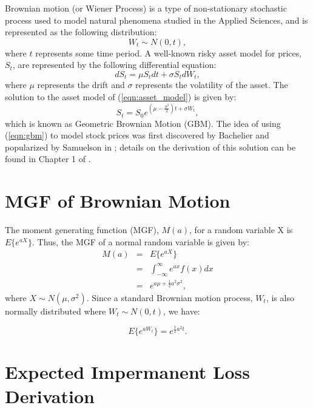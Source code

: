 \documentclass[journal,twocolumn,12pt]{ieeesyscoin}
\begin{document}
Brownian motion (or Wiener Process) is a type of non-stationary stochastic process used to model natural phenomena studied in the Applied Sciences, and is represented as the following distribution:
\begin{equation}\label{eqn:bm}
  W_{t} \sim N(0,t), 
\end{equation}
where $t$ represents some time period. A well-known risky asset model for prices, $S_{t}$, are represented by the following differential equation:
\begin{equation}\label{eqn:asset_model}
  dS_{t} = \mu S_{t}dt + \sigma S_{t} dW_{t},
\end{equation}
where $\mu$ represents the drift and $\sigma$ represents the volatility of the asset. The solution to the asset model of (\ref{eqn:asset_model}) is given by:
\begin{equation}\label{eqn:gbm}
  S_{t} = S_{0} e^{(\mu - \frac{\sigma^2}{2})t  + \sigma W_{t}},
\end{equation}
which is known as Geometric Brownian Motion (GBM). The idea of using (\ref{eqn:gbm}) to model stock prices was first discovered by Bachelier \cite{Bac1900} and popularized by Samuelson in \cite{Sam65}; details on the derivation of this solution can be found in Chapter 1 of \cite{Pri23}.

\section{MGF of Brownian Motion}
\label{sec:exp_brownian_motion}

The moment generating function (MGF), $M(a)$, for a random variable X is $E\{e^{aX}\}$. Thus, the MGF of a normal random variable is given by:
\begin{eqnarray*}\label{eqn:mgf_normal}
M(a) &=& E\{e^{aX}\}\\ 
           &=& \int_{-\infty}^{\infty}e^{ax}f(x)dx \\
           &=& e^{a\mu + \frac{1}{2}a^2\sigma^2},
\end{eqnarray*}
where $X \sim N(\mu, \sigma^2)$. Since a standard Brownian motion process, $W_{t}$, is also normally distributed where $W_{t} \sim N(0,t)$, we have:

\begin{equation}\label{eqn:mgf_bm}
  E\{e^{aW_{t}}\} = e^{\frac{1}{2}a^2t}.
\end{equation}


\section{Expected Impermanent Loss Derivation}
\label{sec:exp_imp_loss_derv}
\end{document}
